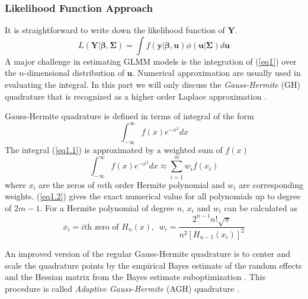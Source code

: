 	\subsubsection{Likelihood Function Approach}
	It is straightforward  to write down the likelihood function of $\bm Y$.
	\begin{equation}\label{eq1}
	L(\bm Y|\bm\beta, \bm \Sigma) = \int f(\bm y|\bm \beta, \bm u)\phi(\bm u|\bm \Sigma)d \bm u
	\end{equation}
	A major challenge in estimating GLMM models is the integration of (\ref{eq1}) over the $n$-dimensional distribution of $\bm u$. Numerical approximation are usually used in evaluating the integral. In this part we will only discuss the \textit{Gauss-Hermite} (GH) quadrature that is recognized as a higher order Laplace approximation \citep{liu1994note}.
	
	Gauss-Hermite quadrature is defined in terms of integral of the form 
	\begin{equation}\label{eq1.1}
	\int_{-\infty}^{\infty}f(x) e^{-x^2}dx
	\end{equation}
	The integral  (\ref{eq1.1}) is approximated by a weighted sum of  $f(x)$ 
	\begin{equation}\label{eq1.2}
	\int_{-\infty}^{\infty}f(x) e^{-x^2}dx \approx \sum_{i=1}^m w_if(x_i)
	\end{equation}
	where $x_i$ are the zeros of $m$th order Hermite polynomial and $w_i$ are corresponding weights.  (\ref{eq1.2}) gives the exact numerical value for all polynomials up to degree of $2m-1$. For a Hermite polynomial of degree $n$, $x_i$ and $w_i$ can be calculated as 	
	\begin{equation}\label{eq1.3}
	x_i = i\text{th zero of } H_n(x),~~  w_i = \frac{2^{n-1}n!\sqrt{\pi}}{n^2[H_{n-1}(x_i)]^2} 
	\end{equation}
	
	An improved version of the regular Gauss-Hermite quadrature is to center and scale the quadrature points  by the empirical Bayes estimate of the random effects and the Hessian matrix from the Bayes estimate suboptimization \citep{liu1994note}. This procedure is called \textit{Adaptive Gauss-Hermite} (AGH) quadrature \citep{pinheiro1995approximations}. %
	
